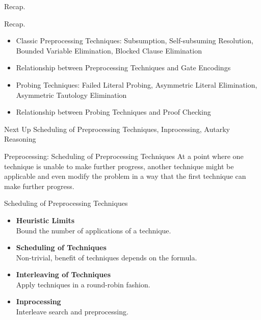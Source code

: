 \documentclass[t]{sdqbeamer}
\begin{document}
\begin{frame}{Recap.}
\begin{block}{Recap.}
\begin{itemize}
    \item Classic Preprocessing Techniques: Subsumption, Self-subsuming Resolution, Bounded Variable Elimination, Blocked Clause Elimination
    \item Relationship between Preprocessing Techniques and Gate Encodings
    \item Probing Techniques: Failed Literal Probing, Asymmetric Literal Elimination, Asymmetric Tautology Elimination
    \item Relationship between Probing Techniques and Proof Checking
\end{itemize}
\end{block}
\begin{block}{Next Up}
Scheduling of Preprocessing Techniques, Inprocessing, Autarky Reasoning
\end{block}
\end{frame}


\begin{frame}{Preprocessing: Scheduling of Preprocessing Techniques}
At a point where one technique is unable to make further progress, another technique might be applicable and even modify the problem in a way that the first technique can make further progress.\\[1ex]

\begin{block}{Scheduling of Preprocessing Techniques}
\begin{itemize}\setlength{\itemsep}{1ex}
    \item \textbf{Heuristic Limits}\\[1pt]
    Bound the number of applications of a technique.
    \item \textbf{Scheduling of Techniques}\\[1pt]
    Non-trivial, benefit of techniques depends on the formula.
    \item \textbf{Interleaving of Techniques}\\[1pt]
    Apply techniques in a round-robin fashion.
    \item \textbf{Inprocessing}\\[1pt]
    Interleave search and preprocessing.
\end{itemize}
\end{block}
\end{frame}
\end{document}
